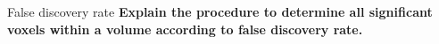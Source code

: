 \documentclass{beamer}
\begin{document}
\begin{frame}{False discovery rate}
  \textbf{Explain the procedure to determine all significant voxels within a volume according to false discovery rate.}


\end{frame}

\end{document}
